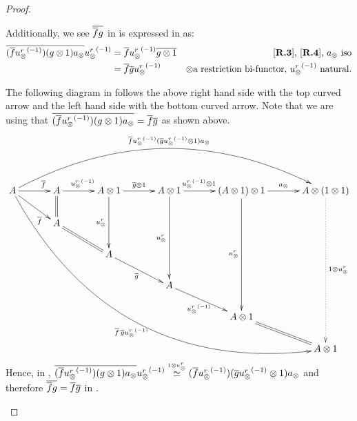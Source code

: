 \begin{proof}
\begin{description}
      Additionally, we see $\overline{\overline{f} g}$ in \Xt is expressed in \X as:
      \begin{align*}
        \overline{(\overline{f} {u_{\otimes}^r}^{(-1)}) (g\otimes 1) a_{\otimes}} {u_{\otimes}^r}^{(-1)}
        & = \overline{f} {u_{\otimes}^r}^{(-1)} \overline{g\otimes 1} & \text{\ensuremath{[\text{\bfseries {R}.{3}}]}, \ensuremath{[\text{\bfseries {R}.{4}}]}, }a_{\otimes} \text{ iso} \\
        & = \overline{f} \overline{g} {u_{\otimes}^r}^{(-1)} & \otimes
          \text{a restriction bi-functor, }{\ensuremath{u_{\otimes}^r}}^{(-1)}\text{ natural.}
      \end{align*}

      The following diagram in \X follows the above right hand side with the top curved arrow and
      the left hand side with the bottom curved arrow. Note that we are using that
      $\overline{(\overline{f} {u_{\otimes}^r}^{(-1)}) (g\otimes 1) a_{\otimes}} = \overline{f}\overline{g}$ as shown above.
      \[
        \xymatrix @C=33pt @R=20pt{
          A \ar@/^45pt/[rrrrr]^{\restr{f} \inv{\usr}(\restr{g} \inv{\usr} \* 1)a_{\*}}
            \ar@/_65pt/[dddddrrrrr]_{\restr{f}\, \restr{g}\inv{\usr}}
            \ar[r]^(.7){\restr{f}}
            \ar[dr]_(.7){\restr{f}}
            &A \ar[r]^{\inv{\usr}}
            \ar@{=}[d]
            &A \* 1 \ar[r]^{\restr{g}\*1}
            \ar[dd]_{\usr}
            &A \* 1 \ar[r]^(.41){\inv{\usr}\* 1}
            \ar[ddd]_{\usr}
            &(A \* 1) \* 1 \ar[r]^{a_{\*}}
            \ar[dddd]_{\usr}
            & A \* (1\*1) \ar@{.>}[ddddd]^{1\*\usr}\\
          &A\ar@{=}[dr]\\
          &&A \ar[dr]_{\restr{g}}\\
          &&&A \ar[dr]_{\inv\usr}\\
          &&&&A\*1 \ar@{=}[dr]\\
          &&&&&A\*1
        }
      \]
      Hence, in \X, $\overline{(\overline{f} {u_{\otimes}^r}^{(-1)}) (g\otimes 1) a_{\otimes}} {u_{\otimes}^r}^{(-1)} \overset{\scriptscriptstyle 1\otimes u_{\otimes}^r}{\simeq}
      (\overline{f} {u_{\otimes}^r}^{(-1)}) (\overline{g} {u_{\otimes}^r}^{(-1)}\otimes 1) a_{\otimes}$ and therefore $\overline{\overline{f} g} =
      \overline{f} \overline{g}$ in \Xt.




\end{description}
\end{proof}
